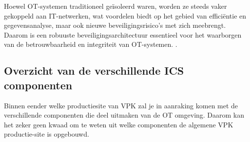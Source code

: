 Hoewel OT-systemen traditioneel geïsoleerd waren, worden ze steeds vaker gekoppeld aan IT-netwerken, wat voordelen biedt op het gebied van efficiëntie en gegevensanalyse, maar ook nieuwe beveiligingsrisico’s met zich meebrengt. Daarom is een robuuste beveiligingsarchitectuur essentieel voor het waarborgen van de betrouwbaarheid en integriteit van OT-systemen. \autocite{Stouffer2023}.


\subsection{Overzicht van de verschillende ICS componenten}
Binnen eender welke productiesite van VPK zal je in aanraking komen met de verschillende componenten die deel uitmaken van de OT omgeving. Daarom kan het zeker geen kwaad om te weten uit welke componenten de algemene VPK productie-site is opgebouwd. 

